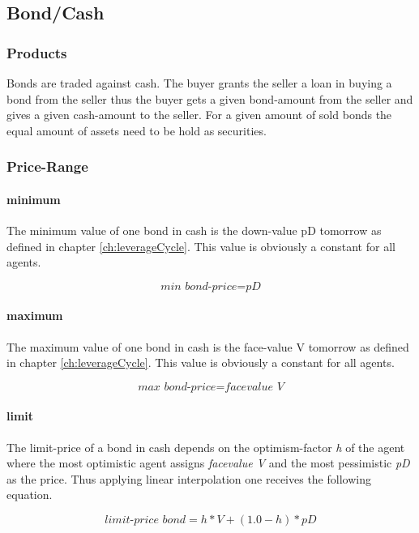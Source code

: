 \documentclass[Bachelorarbeit.tex]{subfiles}
\begin{document}
\subsection{Bond/Cash}
\subsubsection{Products}
Bonds are traded against cash. The buyer grants the seller a loan in buying a bond from the seller thus the buyer gets a given bond-amount from the seller and gives a given cash-amount to the seller. For a given amount of sold bonds the equal amount of assets need to be hold as securities.

\subsubsection{Price-Range}

\paragraph{minimum}
The minimum value of one bond in cash is the down-value pD tomorrow as defined in chapter \ref{ch:leverageCycle}. This value is obviously a constant for all agents.

\begin{equation}
\textit{min bond-price} = \textit{pD}
\end{equation}
 
\paragraph{maximum}
The maximum value of one bond in cash is the face-value V tomorrow as defined in chapter \ref{ch:leverageCycle}. This value is obviously a constant for all agents.

\begin{equation}
\textit{max bond-price} = \textit{facevalue V}
\end{equation}

\paragraph{limit}
The limit-price of a bond in cash depends on the optimism-factor \textit{h} of the agent where the most optimistic agent assigns \textit{facevalue V} and the most pessimistic \textit{pD} as the price. Thus applying linear interpolation one receives the following equation.

\begin{equation}
\textit{limit-price bond} = h * V + ( 1.0 - h ) * pD
\end{equation}
\end{document}
